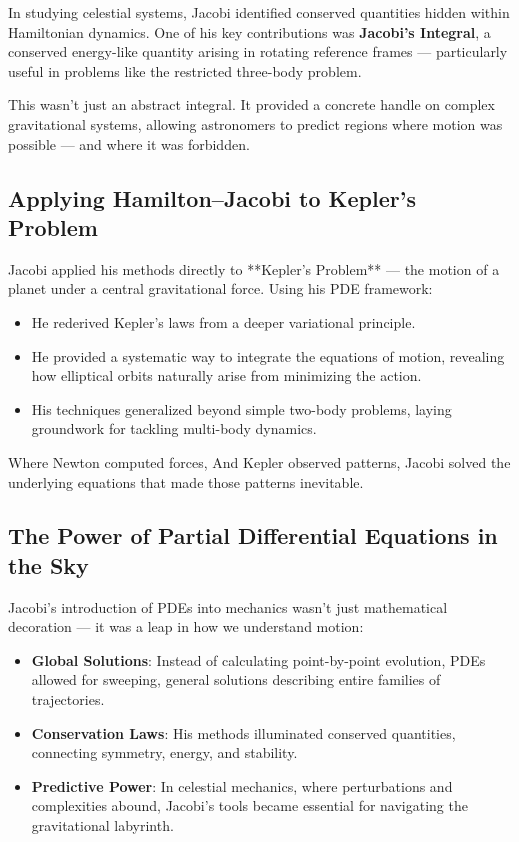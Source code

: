 In studying celestial systems, Jacobi identified conserved quantities hidden within Hamiltonian dynamics. One of his key contributions was \textbf{Jacobi’s Integral}, a conserved energy-like quantity arising in rotating reference frames — particularly useful in problems like the restricted three-body problem.

This wasn’t just an abstract integral. It provided a concrete handle on complex gravitational systems, allowing astronomers to predict regions where motion was possible — and where it was forbidden.

\subsection{Applying Hamilton–Jacobi to Kepler’s Problem}

Jacobi applied his methods directly to **Kepler’s Problem** — the motion of a planet under a central gravitational force. Using his PDE framework:

\begin{itemize}
  \item He rederived Kepler’s laws from a deeper variational principle.
  \item He provided a systematic way to integrate the equations of motion, revealing how elliptical orbits naturally arise from minimizing the action.
  \item His techniques generalized beyond simple two-body problems, laying groundwork for tackling multi-body dynamics.
\end{itemize}

Where Newton computed forces,  
And Kepler observed patterns,  
Jacobi solved the underlying equations that made those patterns inevitable.

\subsection{The Power of Partial Differential Equations in the Sky}

Jacobi’s introduction of PDEs into mechanics wasn’t just mathematical decoration — it was a leap in how we understand motion:

\begin{itemize}
  \item \textbf{Global Solutions}: Instead of calculating point-by-point evolution, PDEs allowed for sweeping, general solutions describing entire families of trajectories.
  \item \textbf{Conservation Laws}: His methods illuminated conserved quantities, connecting symmetry, energy, and stability.
  \item \textbf{Predictive Power}: In celestial mechanics, where perturbations and complexities abound, Jacobi’s tools became essential for navigating the gravitational labyrinth.
\end{itemize}

